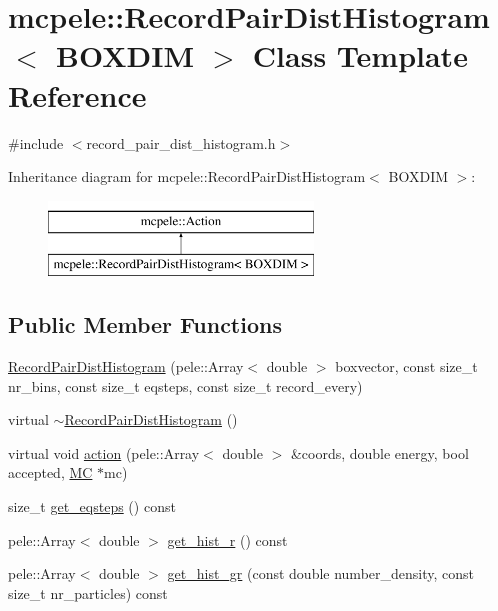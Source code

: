 \hypertarget{classmcpele_1_1RecordPairDistHistogram}{\section{mcpele\-:\-:\-Record\-Pair\-Dist\-Histogram$<$ \-B\-O\-X\-D\-I\-M $>$ \-Class \-Template \-Reference}
\label{classmcpele_1_1RecordPairDistHistogram}
}


{\ttfamily \#include $<$record\-\_\-pair\-\_\-dist\-\_\-histogram.\-h$>$}

\-Inheritance diagram for mcpele\-:\-:\-Record\-Pair\-Dist\-Histogram$<$ \-B\-O\-X\-D\-I\-M $>$\-:\begin{figure}[H]
\begin{center}
\leavevmode
\includegraphics[height=2.000000cm]{classmcpele_1_1RecordPairDistHistogram}
\end{center}
\end{figure}
\subsection*{\-Public \-Member \-Functions}
\begin{DoxyCompactItemize}
\item 
\hyperlink{classmcpele_1_1RecordPairDistHistogram_a8c9dd2de7672d3858e7adf298fbf9c1b}{\-Record\-Pair\-Dist\-Histogram} (pele\-::\-Array$<$ double $>$ boxvector, const size\-\_\-t nr\-\_\-bins, const size\-\_\-t eqsteps, const size\-\_\-t record\-\_\-every)
\item 
virtual \hyperlink{classmcpele_1_1RecordPairDistHistogram_a5c084f8196fff90ea8dcfa9d61fa6d34}{$\sim$\-Record\-Pair\-Dist\-Histogram} ()
\item 
virtual void \hyperlink{classmcpele_1_1RecordPairDistHistogram_a2b0d3af344db398ce16e0a473f7f55c4}{action} (pele\-::\-Array$<$ double $>$ \&coords, double energy, bool accepted, \hyperlink{classmcpele_1_1MC}{\-M\-C} $\ast$mc)
\item 
size\-\_\-t \hyperlink{classmcpele_1_1RecordPairDistHistogram_a58689e61e83ea1223f322bbc20795d0e}{get\-\_\-eqsteps} () const 
\item 
pele\-::\-Array$<$ double $>$ \hyperlink{classmcpele_1_1RecordPairDistHistogram_a33de592d9288de540fc56edfecfbc8f1}{get\-\_\-hist\-\_\-r} () const 
\item 
pele\-::\-Array$<$ double $>$ \hyperlink{classmcpele_1_1RecordPairDistHistogram_ae8e88de17c1654b06412b73b1f9ad9e0}{get\-\_\-hist\-\_\-gr} (const double number\-\_\-density, const size\-\_\-t nr\-\_\-particles) const 
\end{DoxyCompactItemize}


